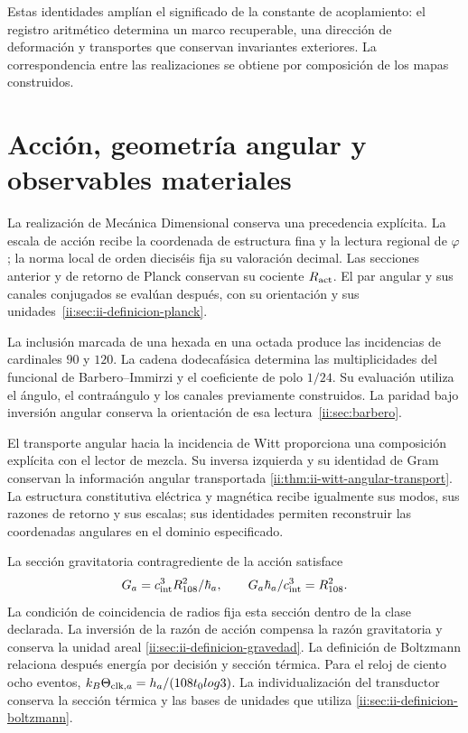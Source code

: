Estas identidades amplían el significado de la constante
de acoplamiento: el registro aritmético determina un
marco recuperable, una dirección de deformación y
transportes que conservan invariantes exteriores.
La correspondencia entre las realizaciones se obtiene
por composición de los mapas construidos.

\section{Acción, geometría angular y observables materiales}

La realización de Mecánica Dimensional conserva una
precedencia explícita. La escala de acción recibe la
coordenada de estructura fina y la lectura regional de
\(\varphi\); la norma local de orden dieciséis fija
su valoración decimal. Las secciones anterior y de
retorno de Planck conservan su cociente
\(R_{\rm act}\). El par angular y sus canales
conjugados se evalúan después, con su orientación y
sus unidades~\ref{ii:sec:ii-definicion-planck}.

La inclusión marcada de una hexada en una octada
produce las incidencias de cardinales \(90\) y \(120\).
La cadena dodecafásica determina las multiplicidades
del funcional de Barbero--Immirzi y el coeficiente
de polo \(1/24\). Su evaluación utiliza el ángulo,
el contraángulo y los canales previamente construidos.
La paridad bajo inversión angular conserva la
orientación de esa lectura~\ref{ii:sec:barbero}.

El transporte angular hacia la incidencia de Witt
proporciona una composición explícita con el lector
de mezcla. Su inversa izquierda y su identidad de
Gram conservan la información angular transportada
\ref{ii:thm:ii-witt-angular-transport}.
La estructura constitutiva eléctrica y magnética
recibe igualmente sus modos, sus razones de retorno
y sus escalas; sus identidades permiten reconstruir
las coordenadas angulares en el dominio especificado.

La sección gravitatoria contragrediente de la acción
satisface
\[
 G_a=\frac{c_{\rm int}^{3}R_{108}^{2}}{\hbar_a},
 \qquad
 \frac{G_a\hbar_a}{c_{\rm int}^{3}}=R_{108}^{2}.
\]
La condición de coincidencia de radios fija esta
sección dentro de la clase declarada. La inversión
de la razón de acción compensa la razón gravitatoria
y conserva la unidad areal
\ref{ii:sec:ii-definicion-gravedad}.
La definición de Boltzmann relaciona después
energía por decisión y sección térmica. Para el
reloj de ciento ocho eventos,
\(k_B\Theta_{{\rm clk},a}=h_a/(108t_0\log3)\).
La individualización del transductor conserva la
sección térmica y las bases de unidades que utiliza
\ref{ii:sec:ii-definicion-boltzmann}.

